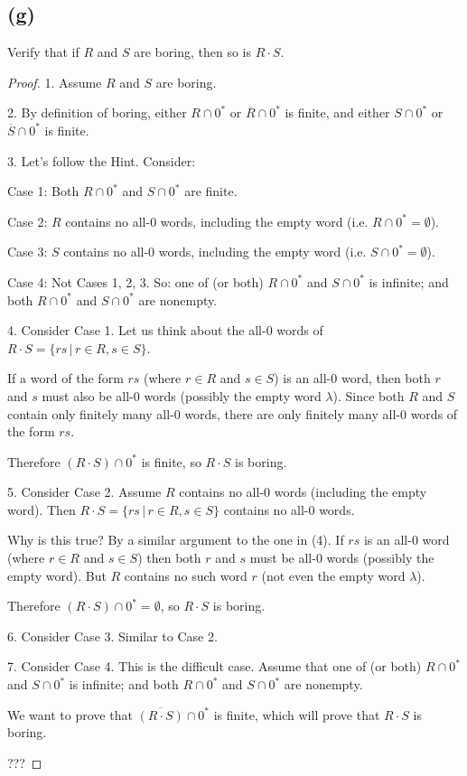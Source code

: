 \documentclass[14pt]{extarticle}
\begin{document}
\subsection{(g)}
Verify that if $R$ and $S$ are boring, then so is $R \cdot S$.
\begin{proof}
1. Assume $R$ and $S$ are boring.

2. By definition of boring, either $R \cap 0^*$ or $\overline{R} \cap 0^*$ is finite, and either $S \cap 0^*$ or $\overline{S} \cap 0^*$ is finite.

3. Let's follow the Hint. Consider:

Case 1: Both $R \cap 0^*$ and $S \cap 0^*$ are finite.

Case 2: $R$ contains no all-0 words, including the empty word (i.e. $R \cap 0^* = \emptyset$).

Case 3: $S$ contains no all-0 words, including the empty word (i.e. $S \cap 0^* = \emptyset$).

Case 4: Not Cases 1, 2, 3. So: one of (or both) $R \cap 0^*$ and $S \cap 0^*$ is infinite; and both $R \cap 0^*$ and $S \cap 0^*$ are nonempty. 

4. Consider Case 1. Let us think about the all-0 words of $R \cdot S = \{rs \, | \, r \in R, s \in S\}$. 

If a word of the form $rs$ (where $r \in R$ and $s \in S$) is an all-0 word, then both $r$ and $s$ must also be all-0 words (possibly the empty word $\lambda$). Since both $R$ and $S$ contain only finitely many all-0 words, there are only finitely many all-0 words of the form $rs$.

Therefore $(R \cdot S) \cap 0^*$ is finite, so $R \cdot S$ is boring.

5. Consider Case 2. Assume $R$ contains no all-0 words (including the empty word). Then $R \cdot S = \{rs \, | \, r \in R, s \in S\}$ contains no all-0 words. 

Why is this true? By a similar argument to the one in (4). If $rs$ is an all-0 word (where $r \in R$ and $s \in S$) then both $r$ and $s$ must be all-0 words (possibly the empty word). But $R$ contains no such word $r$ (not even the empty word $\lambda$).

Therefore $(R \cdot S) \cap 0^* = \emptyset$, so $R \cdot S$ is boring.

6. Consider Case 3. Similar to Case 2.

7. Consider Case 4. This is the difficult case. Assume that one of (or both) $R \cap 0^*$ and $S \cap 0^*$ is infinite; and both $R \cap 0^*$ and $S \cap 0^*$ are nonempty.

We want to prove that $\overline{(R \cdot S)} \cap 0^*$ is finite, which will prove that $R \cdot S$ is boring.

???
\end{proof}
\end{document}
